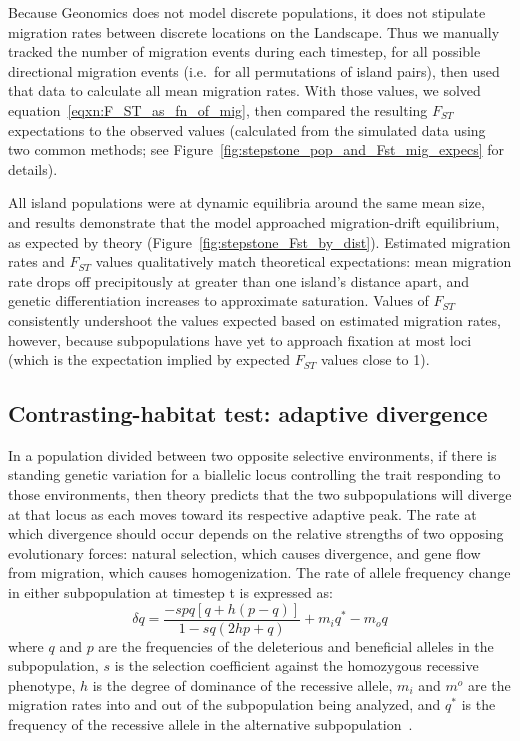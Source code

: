 ﻿\documentclass{article}
\begin{document}
Because Geonomics does not model discrete populations, it does not stipulate
migration rates between discrete locations on the Landscape.
Thus we manually tracked the number of migration events during each timestep,
for all possible directional migration events (i.e.\ for all permutations of island pairs),
then used that data to calculate all mean migration rates.
With those values, we solved equation~\ref{eqxn:F_ST_as_fn_of_mig},
then compared the resulting $F_{ST}$ expectations to the observed values
(calculated from the simulated data using two common methods;
see Figure~\ref{fig:stepstone_pop_and_Fst_mig_expecs} for details).

All island populations were at dynamic equilibria around the same mean size,
and results demonstrate that the model approached migration-drift equilibrium,
as expected by theory (Figure~\ref{fig:stepstone_Fst_by_dist}).
Estimated migration rates and $F_{ST}$ values qualitatively match theoretical expectations:
mean migration rate drops off precipitously at greater than one island's distance apart, 
and genetic differentiation increases to approximate saturation.
Values of $F_{ST}$ consistently undershoot the values expected based on estimated
migration rates, however, because subpopulations have yet to approach fixation
at most loci (which is the expectation implied by expected $F_{ST}$ values
close to 1).


\subsection{Contrasting-habitat test: adaptive divergence}
In a population divided between two opposite selective environments, if there is
standing genetic variation for a biallelic locus controlling the trait responding
to those environments, then theory predicts that the two subpopulations will diverge at
that locus as each moves toward its respective adaptive peak.
The rate at which divergence should occur depends on the relative strengths
of two opposing evolutionary forces: natural selection, which causes divergence,
and gene flow from migration, which causes homogenization. 
The rate of allele frequency change
in either subpopulation at timestep t is expressed as:
\begin{equation}
        \delta{q} = \frac{-spq[q + h(p - q)]}{1 - sq(2hp + q)} + m_{i}q^{*} - m_{o}q
\label{eqxn:rate_allele_freq_change}
\end{equation}
where $q$ and $p$ are the frequencies of the deleterious and beneficial alleles
in the subpopulation, $s$ is the selection
coefficient against the homozygous recessive phenotype, $h$ is the degree of dominance
of the recessive allele, $m_{i}$ and $m^{o}$ are the migration rates into and out of
the subpopulation being analyzed, and $q^{*}$ is the frequency of the recessive allele
in the alternative subpopulation~\cite{hartl}.
\end{document}

